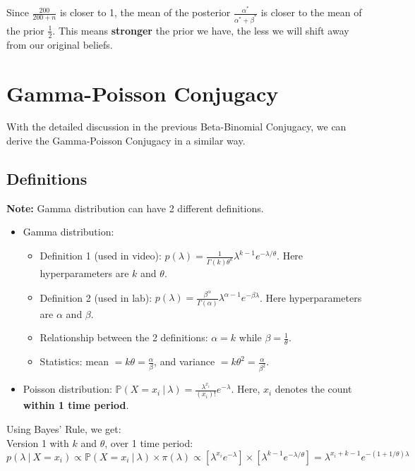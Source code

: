 \documentclass{article}
\def\dsst{\displaystyle}
\begin{document}
Since $\dsst \frac{200}{200+n}$ is closer to 1, the mean of the posterior $\dsst \frac{\alpha^*}{\alpha^*+\beta^*}$ is closer to the mean of the prior $\dsst \frac{1}{2}$. This means \textbf{stronger} the prior we have, the less we will shift away from our original beliefs.

\section{Gamma-Poisson Conjugacy}

With the detailed discussion in the previous Beta-Binomial Conjugacy, we can derive the Gamma-Poisson Conjugacy in a similar way.

\subsection{Definitions}

\textbf{Note:} Gamma distribution can have 2 different definitions.

\begin{itemize}
\item Gamma distribution: 
\begin{itemize}
\item Definition 1 (used in video): $ \dsst p(\lambda) = \frac{1}{\Gamma(k)\theta^k}\lambda^{k-1}e^{-\lambda/\theta}$. Here hyperparameters are $k$ and $\theta$.

\item Definition 2 (used in lab): $ \dsst p(\lambda) = \frac{\beta^\alpha}{\Gamma(\alpha)}\lambda^{\alpha-1}e^{-\beta\lambda} $. Here hyperparameters are $\alpha$ and $\beta$.

\item Relationship between the 2 definitions: $\alpha=k$ while $\beta = \dsst \frac{1}{\theta}$.

\item Statistics: mean $= k\theta = \dsst \frac{\alpha}{\beta}$, and variance $= k\theta^2 = \dsst \frac{\alpha}{\beta^2} $.
\end{itemize}
\item Poisson distribution: $\dsst \mathbb{P}(X = x_i~|~\lambda) = \frac{\lambda^{x_i}}{(x_i)!}e^{-\lambda} $. Here, $x_i$ denotes the count \textbf{within 1 time period}.\\
\end{itemize}

Using Bayes' Rule, we get:\\

Version 1 with $k$ and $\theta$, over 1 time period:
$$ p(\lambda~|~X=x_i) \propto \mathbb{P}(X=x_i~|~\lambda)\times \pi(\lambda) \propto \left[\lambda^{x_i}e^{-\lambda}\right]\times\left[\lambda^{k-1}e^{-\lambda/\theta}\right]=\lambda^{x_i+k-1}e^{-(1+1/\theta)\lambda} $$ 
\end{document}
